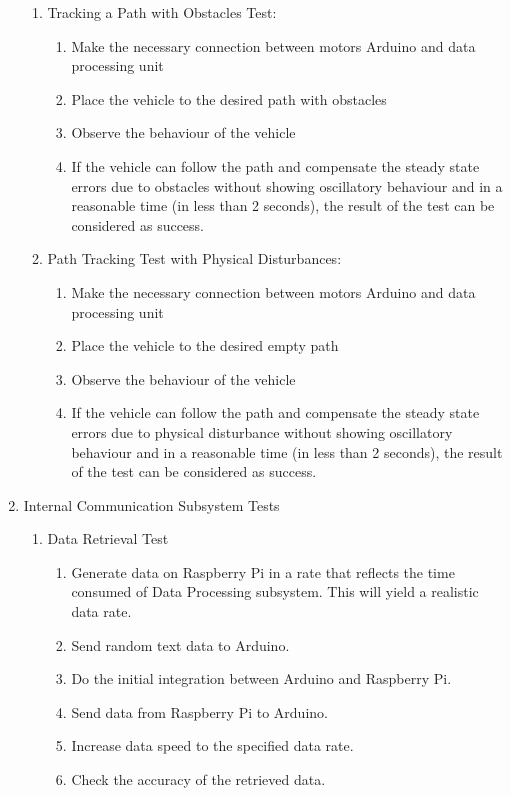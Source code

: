 \documentclass[a4paper,12pt]{article}
\begin{document}
\begin{enumerate}
\begin{enumerate}
			
		\item Tracking a Path with Obstacles Test:	
			\begin{enumerate}
				\item Make the necessary connection between motors Arduino and data processing unit  
				\item Place the vehicle to the desired path with obstacles  
				\item Observe the behaviour of the vehicle  
				\item If the vehicle can follow the path and compensate the steady state errors due to obstacles without showing oscillatory behaviour and in a reasonable time (in less than 2 seconds), the result of the test can be considered as success.  
			\end{enumerate}
				
		
		\item Path Tracking Test with Physical Disturbances:
			\begin{enumerate}
				\item Make the necessary connection between motors Arduino and data processing unit  
				\item Place the vehicle to the desired empty path   
				\item Observe the behaviour of the vehicle  
				\item If the vehicle can follow the path and compensate the steady state errors due to physical disturbance without showing oscillatory behaviour and in a reasonable time (in less than 2 seconds), the result of the test can be considered as success.  
			\end{enumerate}
		
		\end{enumerate}
		
		
		\item {Internal Communication Subsystem Tests}
		\begin{enumerate}
			 \item Data Retrieval Test
			\begin{enumerate}
					\item Generate data on Raspberry Pi in a rate that reflects the time consumed of Data Processing subsystem. This will yield a realistic data rate.  
				\item Send random text data to Arduino.  
				\item Do the initial integration between Arduino and Raspberry Pi.  
				\item Send data from Raspberry Pi to Arduino.  
				\item Increase data speed to the specified data rate.  
				\item Check the accuracy of the retrieved data. 
	\end{enumerate}
		\end{enumerate}
	 

\end{enumerate}
\end{document}
